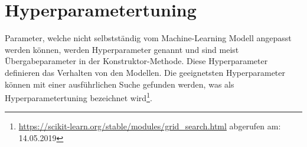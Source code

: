 \section{Hyperparametertuning}
Parameter, welche nicht selbstständig vom Machine-Learning Modell angepasst werden können, werden Hyperparameter genannt und sind meist Übergabeparameter in der Konstruktor-Methode.
Diese Hyperparameter definieren das Verhalten von den Modellen.
Die geeignetsten Hyperparameter können mit einer ausführlichen Suche gefunden werden, was als Hyperparametertuning bezeichnet wird\footnote{\url{https://scikit-learn.org/stable/modules/grid_search.html} abgerufen am: 14.05.2019}\cite{scikit-learn}.